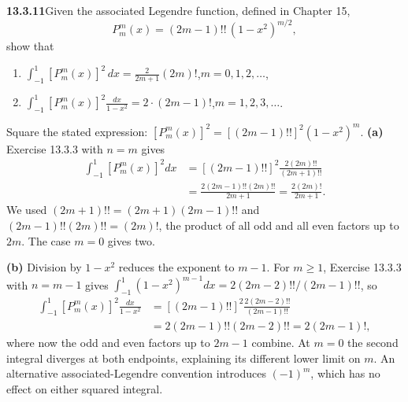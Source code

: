 \par\bigskip
\noindent\textbf{13.3.11}\quad Given the associated Legendre function, defined
in Chapter 15,
\[
P_{m}^{m}(x)=(2m-1)!!\,(1-x^{2})^{m/2},
\]
show that
\begin{enumerate}
\item[(a)] $\displaystyle\int_{-1}^{1}[P_{m}^{m}(x)]^{2}\,dx
  =\frac{2}{2m+1}(2m)!$,\quad$m=0,1,2,\ldots$,
\item[(b)] $\displaystyle\int_{-1}^{1}[P_{m}^{m}(x)]^{2}\frac{dx}{1-x^{2}}
  =2\cdot(2m-1)!$,\quad$m=1,2,3,\ldots$.
\end{enumerate}
\solution
Square the stated expression:
$[P_m^m(x)]^2=[(2m-1)!!]^2(1-x^2)^m$.
\textbf{(a)} Exercise 13.3.3 with $n=m$ gives
\begin{align*}
\int_{-1}^1[P_m^m(x)]^2dx
&=[(2m-1)!!]^2\frac{2(2m)!!}{(2m+1)!!}\\
&=\frac{2(2m-1)!!(2m)!!}{2m+1}
=\boxed{\frac{2(2m)!}{2m+1}}.
\end{align*}
We used $(2m+1)!!=(2m+1)(2m-1)!!$ and
$(2m-1)!!(2m)!!=(2m)!$, the product of all odd and all even
factors up to $2m$.  The case $m=0$ gives two.

\textbf{(b)} Division by $1-x^2$ reduces the exponent to $m-1$.
For $m\ge1$, Exercise 13.3.3 with $n=m-1$ gives
$\int_{-1}^1(1-x^2)^{m-1}dx=2(2m-2)!!/(2m-1)!!$, so
\begin{align*}
\int_{-1}^1[P_m^m(x)]^2\frac{dx}{1-x^2}
&=[(2m-1)!!]^2\frac{2(2m-2)!!}{(2m-1)!!}\\
&=2(2m-1)!!(2m-2)!!
=\boxed{2(2m-1)!},
\end{align*}
where now the odd and even factors up to $2m-1$ combine.
At $m=0$ the second integral diverges at both endpoints,
explaining its different lower limit on $m$.  An alternative
associated-Legendre convention introduces $(-1)^m$, which has
no effect on either squared integral.


